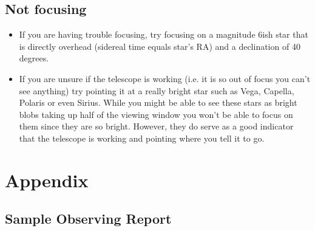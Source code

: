 \documentclass[11pt]{report}
\begin{document}
\section{Not focusing}
\begin{itemize}
\item If you are having trouble focusing, try focusing on a magnitude 6ish star that is directly overhead (sidereal time equals star's RA) and a declination of 40 degrees.
\item If you are unsure if the telescope is working (i.e. it is so out of focus you can't see anything) try pointing it at a really bright star such as Vega, Capella, Polaris or even Sirius. While you might be able to see these stars as bright blobs taking up half of the viewing window you won't be able to focus on them since they are so bright. However, they do serve as a good indicator that the telescope is working and pointing where you tell it to go.
\end{itemize}


\chapter{Appendix}

\section{Sample Observing Report}
\end{document}
